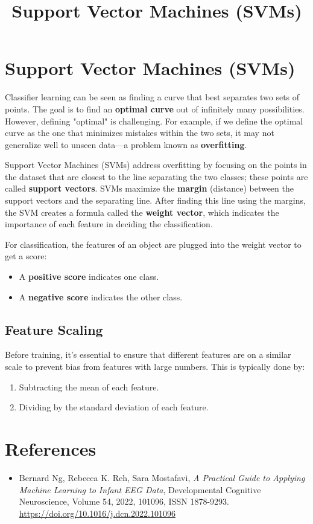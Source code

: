 \documentclass{article}
\title{Support Vector Machines (SVMs)}
\author{}
\date{}
\begin{document}
\maketitle

\section{Support Vector Machines (SVMs)}
Classifier learning can be seen as finding a curve that best separates two sets of points. The goal is to find an \textbf{optimal curve} out of infinitely many possibilities. However, defining "optimal" is challenging. For example, if we define the optimal curve as the one that minimizes mistakes within the two sets, it may not generalize well to unseen data—a problem known as \textbf{overfitting}.

Support Vector Machines (SVMs) address overfitting by focusing on the points in the dataset that are closest to the line separating the two classes; these points are called \textbf{support vectors}. SVMs maximize the \textbf{margin} (distance) between the support vectors and the separating line. After finding this line using the margins, the SVM creates a formula called the \textbf{weight vector}, which indicates the importance of each feature in deciding the classification.

For classification, the features of an object are plugged into the weight vector to get a score:
\begin{itemize}
    \item A \textbf{positive score} indicates one class.
    \item A \textbf{negative score} indicates the other class.
\end{itemize}

\subsection{Feature Scaling}
Before training, it’s essential to ensure that different features are on a similar scale to prevent bias from features with large numbers. This is typically done by:
\begin{enumerate}
    \item Subtracting the mean of each feature.
    \item Dividing by the standard deviation of each feature.
\end{enumerate}

\section{References}
\begin{itemize}
    \item Bernard Ng, Rebecca K. Reh, Sara Mostafavi, \emph{A Practical Guide to Applying Machine Learning to Infant EEG Data}, Developmental Cognitive Neuroscience, Volume 54, 2022, 101096, ISSN 1878-9293. \href{https://doi.org/10.1016/j.dcn.2022.101096}{https://doi.org/10.1016/j.dcn.2022.101096}
\end{itemize}
\end{document}
